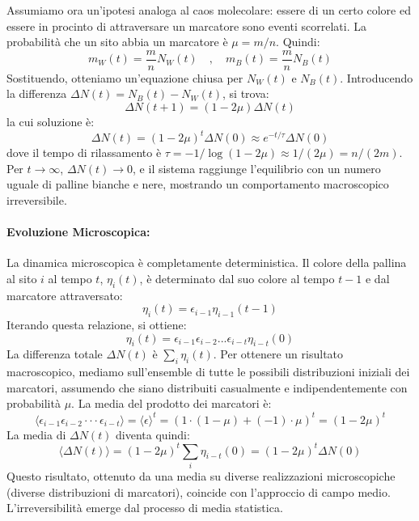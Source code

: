 Assumiamo ora un'ipotesi analoga al caos molecolare: essere di un certo colore ed essere in procinto di attraversare un marcatore sono eventi scorrelati. La probabilità che un sito abbia un marcatore è $\mu = m/n$. Quindi:
\begin{equation}
m_{W}(t) = \frac{m}{n}N_{W}(t) \quad , \quad m_{B}(t) = \frac{m}{n}N_{B}(t)
\end{equation}
Sostituendo, otteniamo un'equazione chiusa per $N_W(t)$ e $N_B(t)$. Introducendo la differenza $\Delta N(t) = N_B(t) - N_W(t)$, si trova:
\begin{equation}
\Delta N(t+1) = (1-2\mu)\Delta N(t)
\end{equation}
la cui soluzione è:
\begin{equation}
\Delta N(t)=(1-2\mu)^{t}\Delta N(0) \approx e^{-t/\tau}\Delta N(0)
\end{equation}
dove il tempo di rilassamento è $\tau = -1/\log(1-2\mu) \approx 1/(2\mu) = n/(2m)$. Per $t \to \infty$, $\Delta N(t) \to 0$, e il sistema raggiunge l'equilibrio con un numero uguale di palline bianche e nere, mostrando un comportamento macroscopico irreversibile.

\paragraph{Evoluzione Microscopica:}
La dinamica microscopica è completamente deterministica. Il colore della pallina al sito $i$ al tempo $t$, $\eta_i(t)$, è determinato dal suo colore al tempo $t-1$ e dal marcatore attraversato:
\begin{equation}
\eta_{i}(t)=\epsilon_{i-1}\eta_{i-1}(t-1)
\end{equation}
Iterando questa relazione, si ottiene:
\begin{equation}
\eta_{i}(t) = \epsilon_{i-1}\epsilon_{i-2}...\epsilon_{i-t}\eta_{i-t}(0)
\end{equation}
La differenza totale $\Delta N(t)$ è $\sum_i \eta_i(t)$. Per ottenere un risultato macroscopico, mediamo sull'ensemble di tutte le possibili distribuzioni iniziali dei marcatori, assumendo che siano distribuiti casualmente e indipendentemente con probabilità $\mu$. La media del prodotto dei marcatori è:
\begin{equation}
\langle\epsilon_{i-1}\epsilon_{i-2}\cdot\cdot\cdot\epsilon_{i-t}\rangle = \langle\epsilon\rangle^t = (1 \cdot (1-\mu) + (-1)\cdot\mu)^t = (1-2\mu)^t
\end{equation}
La media di $\Delta N(t)$ diventa quindi:
\begin{equation}
\langle\Delta N(t)\rangle = (1-2\mu)^{t}\sum_i \eta_{i-t}(0) = (1-2\mu)^{t}\Delta N(0)
\end{equation}
Questo risultato, ottenuto da una media su diverse realizzazioni microscopiche (diverse distribuzioni di marcatori), coincide con l'approccio di campo medio. L'irreversibilità emerge dal processo di media statistica.

